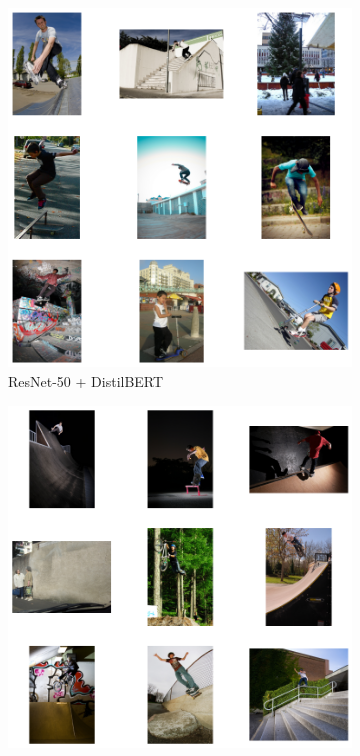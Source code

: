 \documentclass[11pt]{article}
\begin{document}
\begin{figure}[H]
    \centering
    \begin{subfigure}[b]{0.3\textwidth}
        \includegraphics[width=\linewidth]{Q2/A man skateboarding in the city/1.png}
        \caption{\tiny ResNet-50 + DistilBERT}
    \end{subfigure}
    \hfill
    \begin{subfigure}[b]{0.3\textwidth}
        \includegraphics[width=\linewidth]{Q2/A man skateboarding in the city/2.png}

\end{subfigure}
\end{figure}
\end{document}
